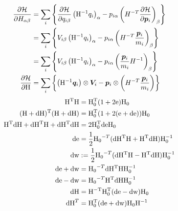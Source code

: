 \documentclass[11pt,a4paper,uplatex]{jsarticle}
\begin{document}
\begin{align}
    \frac{\partial {\cal H}}{\partial H_{\alpha \beta}} 
    &= \sum_{i} \left\{ \frac{\partial {\cal H}}{\partial q_{i \beta}} \left({\rm H}^{-1} q_{i}\right)_{\alpha}
    -  p_{i \alpha} \left( H^{-T} \frac{\partial {\cal H}}{\partial \bm{p}_{i}}  \right)_{\beta} \right\} \\
    &= \sum_{i} \left\{ V_{i \beta} \left({\rm H}^{-1} q_{i}\right)_{\alpha}
    -  p_{i \alpha} \left( H^{-T}\frac{\bm{p}_{i}}{m_{i}}  \right)_{\beta} \right\} \\
    &= \sum_{i} \left\{ V_{i \beta} \left({\rm H}^{-1} q_{i}\right)_{\alpha}
    -  p_{i \alpha} \left( \frac{\bm{p}_{i}}{m_{i}} H^{-1} \right)_{\beta} \right\}  \\
    \frac{\partial {\cal H}}{\partial {\rm H}} &= \sum_{i} \left\{ \left({\rm H}^{-1} \bm{q}_{i}\right) \otimes \bm{V}_{i} 
    - \bm{p}_{i} \otimes \left( H^{-T}\frac{\bm{p}_{i}}{m_{i}}  \right) \right\}     
\end{align}
\begin{align}
    {\rm H^{T} H} &= {\rm H_{0}^{T}} ( 1 + 2 {\rm e}) {\rm H_{0} } \\
    {\rm (H + dH)^{T} (H+dH)} &= {\rm H_{0}^{T}} (1 + 2({\rm e+de })) {\rm H_{0} } \\
    {\rm H^{T} dH + dH^{T} H + dH^{T} dH } &= 2 {\rm H_{0}^{T} de H_{0} }\\
    {\rm de} &= \frac{1}{2} {\rm H_{0}}^{-T} ( {\rm dH^{T} H + H^{T} dH } ) {\rm H_{0}^{-1}}\\
    {\rm dw} &:= \frac{1}{2} {\rm H_{0}}^{-T} ( {\rm  dH^{T} H - H^{T} dH } ) {\rm H_{0}^{-1}} \\
    {\rm de + dw} &= {\rm H_{0}}^{-T} {\rm dH^{T} H  H_{0}^{-1} } \\
    {\rm de - dw} &= {\rm H_{0}}^{-T} {\rm H^{T} dH  H_{0}^{-1} } \\
    {\rm dH} &= {\rm H^{-T} H_{0}^{T}} ({\rm de - dw}) {\rm H_{0}} \\
    {\rm dH}^{T} &= {\rm H_{0}^{T}}({\rm de + dw}) {\rm H_{0}} {\rm H}^{-1}\\
\end{align}
\end{document}
